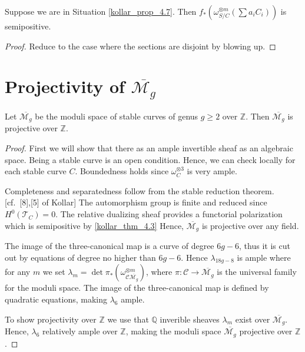 \begin{lemma}
Suppose we are in Situation \ref{kollar_prop_4.7}.
Then $f_{*}(\omega_{S/C}^{\otimes m}(\sum a_iC_i))$ is semipositive.
\end{lemma}
\begin{proof}
Reduce to the case where the sections are disjoint by blowing up.
\end{proof}

\section{Projectivity of $\overline{\mathcal{M}_g}$}

\begin{lemma}
Let $\overline{\mathcal{M}_g}$ be the moduli space of stable curves of genus $g\geq 2$ over $\mathbb{Z}$. Then $\overline{\mathcal{M}_g}$ is projective over $\mathbb{Z}$.
\end{lemma}
\begin{proof}
First we will show that there as an ample invertible sheaf as an algebraic space. Being a stable curve is an open condition. Hence, we can check locally for each stable curve $C$. Boundedness holds since $\omega_C^{\otimes 3}$ is very ample.

Completeness and separatedness follow from the stable reduction theorem. [cf.\ {[8],[5]  of Kollar}] The automorphism group is finite and reduced since $H^0(\mathcal{T}_C)=0$. The relative dualizing sheaf provides a functorial polarization which is semipositive by \ref{kollar_thm_4.3}  Hence, $\overline{\mathcal{M}_g}$ is projective over any field.

The image of the three-canonical map is a curve of degree $6g-6$, thus it is cut out by equations of degree no higher than $6g-6$. Hence $\lambda_{18g-8}$ is ample where for any $m$ we set $\lambda_m=\det \pi_*(\omega^{\otimes m}_{\mathcal{C}\overline{\mathcal{M}_g}})$, where $\pi:\mathcal{C}\to \overline{\mathcal{M}_g}$ is the universal family for the moduli space.  The image of the three-canonical map is defined by quadratic equations, making $\lambda_6$ ample.

To show projectivity over $\mathbb{Z}$ we use that $\mathbb{Q}$ inverible sheaves $\lambda_m$ exist over $\overline{\mathcal{M}_g}$. Hence, $\lambda_6$ relatively ample over $\mathbb{Z}$, making the moduli space $\overline{\mathcal{M}_g}$ projective over $\mathbb{Z}$.
\end{proof}





